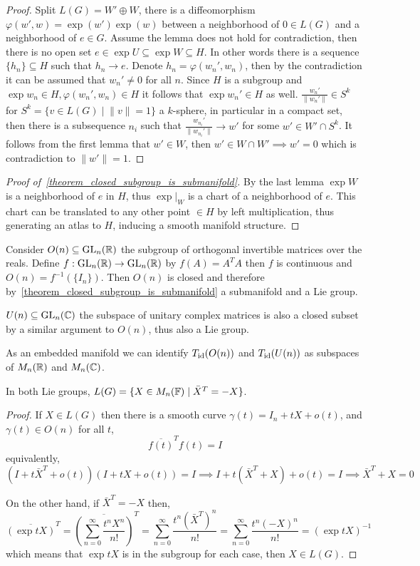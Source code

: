 \begin{proof}
	Split $L(G) = W' \oplus W$, there is a diffeomorphism $\varphi(w', w) = \exp(w') \exp(w)$ between a neighborhood of $0 \in L(G)$ and a neighborhood of $e \in G$.
	Assume the lemma does not hold for contradiction, then there is no open set $e \in \exp U \subseteq \exp W \subseteq H$.
	In other words there is a sequence $\{ h_n \} \subseteq H$ such that $h_n \to e$. Denote $h_n = \varphi(w_n', w_n)$, then by the contradiction it can be assumed that $w_n' \ne 0$ for all $n$.
	Since $H$ is a subgroup and $\exp w_n \in H, \varphi(w_n', w_n) \in H$ it follows that $\exp w_n' \in H$ as well.
	$\frac{w_n'}{\lVert w_n' \rVert} \in S^k$ for $S^k = \{ v \in L(G) \mid \lVert v \rVert = 1 \}$ a $k$-sphere, in particular in a compact set,
	then there is a subsequence $n_i$ such that $\frac{w_{n_i}'}{\lVert w_{n_i}' \rVert} \to w'$ for some $w' \in W' \cap S^k$.
	It follows from the first lemma that $w' \in W$, then $w' \in W \cap W' \implies w' = 0$ which is contradiction to $\lVert w' \rVert = 1$.
\end{proof}
\begin{proof}[Proof of\ \ref{theorem_closed_subgroup_is_submanifold}]
	By the last lemma $\exp W$ is a neighborhood of $e$ in $H$, thus $\exp |_W$ is a chart of a neighborhood of $e$.
	This chart can be translated to any other point $\in H$ by left multiplication, thus generating an atlas to $H$, inducing a smooth manifold structure.
\end{proof}
\begin{example}
	Consider $O(n) \subseteq \operatorname{GL}_n(\mathbb{R})$ the subgroup of orthogonal invertible matrices over the reals.
	Define $f : \operatorname{GL}_n(\mathbb{R}) \to \operatorname{GL}_n(\mathbb{R})$ by $f(A) = A^T A$ then $f$ is continuous and $O(n) = f^{-1}(\{ I_n \})$.
	Then $O(n)$ is closed and therefore by\ \ref{theorem_closed_subgroup_is_submanifold} a submanifold and a Lie group.
\end{example}
\begin{example}
	$U(n) \subseteq \operatorname{GL}_n(\mathbb{C})$ the subspace of unitary complex matrices is also a closed subset by a similar argument to $O(n)$, thus also a Lie group.
\end{example}
As an embedded manifold we can identify $T_{\operatorname{id}}(O(n))$ and $T_{\operatorname{id}}(U(n))$ as subspaces of $M_n(\mathbb{R})$ and $M_n(\mathbb{C})$.
\begin{proposition}
	In both Lie groups, $L(G) = \{ X \in M_n(\mathbb{F}) \mid \bar{X}^T = -X \}$.
\end{proposition}
\begin{proof}
	If $X \in L(G)$ then there is a smooth curve $\gamma(t) = I_n + t X + o(t)$, and $\gamma(t) \in O(n)$ for all $t$,
	\[
		\overline{f(t)}^T f(t)
		= I
	\]
	equivalently,
	\[
		(I + t \bar{X}^T + o(t))(I + t X + o(t)) = I
		\implies
		I + t (\bar{X}^T + X) + o(t) = I
		\implies
		\bar{X}^T + X = 0
	\]

	On the other hand, if $\bar{X}^T = -X$ then,
	\[
		\overline{(\exp t X)}^T
		= \overline{\left(\sum_{n = 0}^\infty \frac{t^n X^n}{n!}\right)}^T
		= \sum_{n = 0}^\infty \frac{t^n {(\bar{X}^T)}^n}{n!}
		= \sum_{n = 0}^\infty \frac{t^n {(-X)}^n}{n!}
		= {(\exp t X)}^{-1}
	\]
	which means that $\exp t X$ is in the subgroup for each case, then $X \in L(G)$.
\end{proof}
